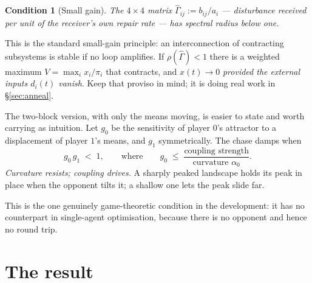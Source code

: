 \documentclass[11pt]{article}
\newtheorem{condition}{Condition}
\theoremstyle{definition}
\begin{document}
\begin{condition}[Small gain]\label{cond:G}
The $4 \times 4$ matrix $\hat\Gamma_{ij} := b_{ij}/a_i$ --- disturbance received
per unit of the receiver's own repair rate --- has spectral radius below one.
\end{condition}

\noindent
This is the standard small-gain principle: an interconnection of contracting
subsystems is stable if no loop amplifies. If $\rho(\hat\Gamma) < 1$ there is a
weighted maximum $V = \max_i x_i / \pi_i$ that contracts, and $x(t) \to 0$
\emph{provided the external inputs $d_i(t)$ vanish}. Keep that proviso in mind; it
is doing real work in \S\ref{sec:anneal}.

The two-block version, with only the means moving, is easier to state and worth
carrying as intuition. Let $g_0$ be the sensitivity of player $0$'s attractor to a
displacement of player $1$'s means, and $g_1$ symmetrically. The chase damps when
\begin{equation}\label{eq:sg2}
  g_0 \, g_1 \;<\; 1 ,
  \qquad\text{where}\qquad
  g_0 \;\le\; \frac{\text{coupling strength}}{\text{curvature } \alpha_0} .
\end{equation}
\emph{Curvature resists; coupling drives.} A sharply peaked landscape holds its
peak in place when the opponent tilts it; a shallow one lets the peak slide far.

This is the one genuinely game-theoretic condition in the development: it has no
counterpart in single-agent optimisation, because there is no opponent and hence
no round trip.

\section{The result}
\end{document}
